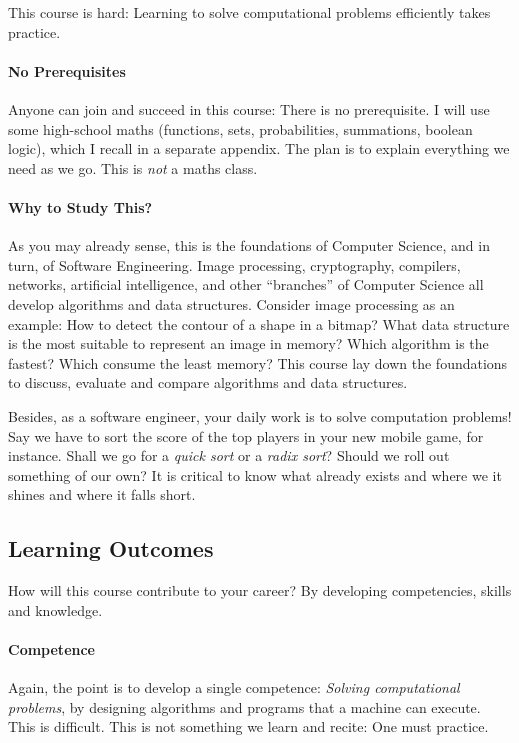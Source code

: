 \documentclass{aldast}
\begin{document}
\begin{takeaway}
  This course is hard: Learning to solve computational problems
  efficiently takes practice.
\end{takeaway}

\paragraph{No Prerequisites} Anyone can join and succeed in this
course: There is no prerequisite. I will use some high-school maths
(functions, sets, probabilities, summations, boolean logic), which I
recall in a separate appendix. The plan is to explain everything we
need as we go. This is \emph{not} a maths class.

\paragraph{Why to Study This?}
As you may already sense, this is the foundations of Computer Science,
and in turn, of Software Engineering. Image processing, cryptography,
compilers, networks, artificial intelligence, and other ``branches''
of Computer Science all develop algorithms and data
structures. Consider image processing as an example: How to detect the
contour of a shape in a bitmap?  What data structure is the most
suitable to represent an image in memory? Which algorithm is the
fastest? Which consume the least memory? This course lay down the
foundations to discuss, evaluate and compare algorithms and data
structures.

Besides, as a software engineer, your daily work is to solve
computation problems! Say we have to sort the score of the top players
in your new mobile game, for instance. Shall we go for a \emph{quick
  sort} or a \emph{radix sort}?  Should we roll out something of our
own? It is critical to know what already exists and where we it shines
and where it falls short.


\subsection{Learning Outcomes}

How will this course contribute to your career? By
developing competencies, skills and knowledge.

\paragraph{Competence}
Again, the point is to develop a single competence: \emph{Solving
  computational problems}, by designing algorithms and programs that a
machine can execute. This is difficult. This is not something we learn
and recite: One must practice.
\end{document}
